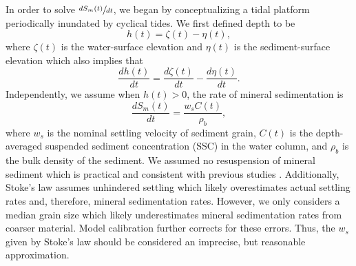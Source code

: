 In order to solve $\sfrac{dS_m(t)}{dt}$, we began by conceptualizing a tidal platform periodically inundated by cyclical tides. We first defined depth to be
\begin{equation}\label{eq:depth}
	h(t) = \zeta(t) - \eta(t),
\end{equation}
where $\zeta(t)$ is the water-surface elevation and $\eta(t)$ is the sediment-surface elevation which also implies that
\begin{equation}\label{eq:depth_dt}
	\frac{dh(t)}{dt} = \frac{d\zeta(t)}{dt} - \frac{d\eta(t)}{dt}.
\end{equation}
Independently, we assume when $h(t) > 0$, the rate of mineral sedimentation is
\begin{equation}\label{eq:sed_flux}
	\frac{dS_m(t)}{dt} = \frac{w_sC(t)}{\rho_b},
\end{equation}
where $w_s$ is the nominal settling velocity of sediment grain, $C(t)$ is the depth-averaged suspended sediment concentration (SSC) in the water column, and $\rho_b$ is the bulk density of the sediment. We assumed no resuspension of mineral sediment which is practical and consistent with previous studies \citep{kroneMethodSimulatingMarsh1987, allenSaltmarshGrowthStratification1990, frenchNumericalSimulationVertical1993, temmermanModellingLongtermTidal2003, temmermanModellingEstuarineVariations2004}. Additionally, Stoke's law assumes unhindered settling which likely overestimates actual settling rates and, therefore, mineral sedimentation rates. However, we only considers a median grain size which likely underestimates mineral sedimentation rates from coarser material. Model calibration further corrects for these errors. Thus, the $w_s$ given by Stoke's law should be considered an imprecise, but reasonable approximation.

